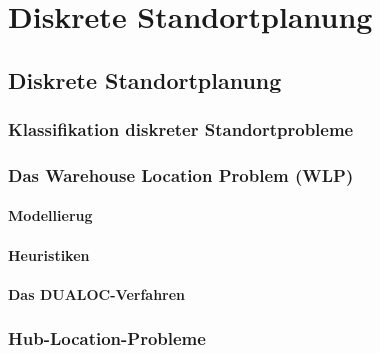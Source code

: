 
\chapter{Diskrete Standortplanung} %
\label{cha:diskrete_standortplanung}


\section{Diskrete Standortplanung} %
    \label{sec:diskrete_standortplanung}
    
      \subsection{Klassifikation diskreter Standortprobleme} %
      \label{sub:klassifikation_diskreter_standortprobleme}
      

      \subsection{Das Warehouse Location Problem (WLP)} %
      \label{sub:das_warehouse_location_problem_}

        \subsubsection{Modellierug} %
        \label{ssub:modellierug}
        

        \subsubsection{Heuristiken} %
        \label{ssub:heuristiken}




        \subsubsection{Das DUALOC-Verfahren} %
        \label{ssub:das_dualoc_verfahren}
        


      \subsection{Hub-Location-Probleme} %
      \label{sub:hub_location_probleme}
      

